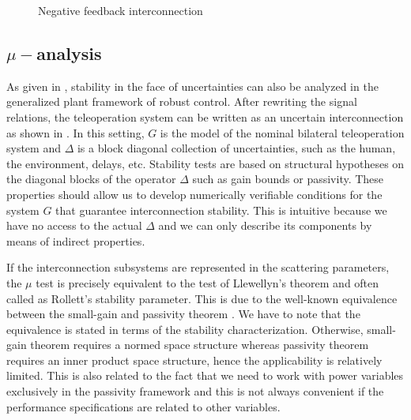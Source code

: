 \begin{figure}%
\centering
{}
\caption{Negative feedback interconnection}%
\label{fig:lit:passint}%
\end{figure}

\subsection{$\mu-$analysis}
As given in , stability in the face of uncertainties can also be analyzed in the generalized plant framework 
of robust control. After rewriting the signal relations, the teleoperation system can be written as an uncertain interconnection as 
shown in . In this setting, $G$ is the model of the nominal bilateral teleoperation system and $\Delta$ 
is a block diagonal collection of uncertainties, such as the human, the environment, delays, etc. Stability tests are based on structural 
hypotheses on the diagonal blocks of the operator $\Delta$ such as gain bounds or passivity. These properties should allow us to develop 
numerically verifiable conditions for the system $G$ that guarantee interconnection stability. This is intuitive because we have no access 
to the actual $\Delta$ and we can only describe its components by means of indirect properties. 

If the interconnection subsystems are represented in the scattering parameters, the $\mu$ test is precisely equivalent to the test of
Llewellyn's theorem and often called as Rollett's stability parameter. This is due to the well-known equivalence between the small-gain 
and passivity theorem \cite{desvid}. We have to note that the equivalence is stated in terms of the stability characterization. Otherwise, 
small-gain theorem requires a normed space structure whereas passivity theorem requires an inner product space structure, hence the 
applicability is relatively limited. This is also related to the fact that we need to work with power variables exclusively in the 
passivity framework and this is not always convenient if the performance specifications are related to other variables.

